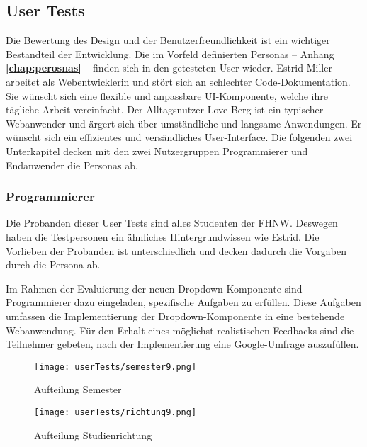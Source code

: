 \subsection{User Tests}
\label{sec:userTests}

Die Bewertung des Design und der Benutzerfreundlichkeit ist ein wichtiger Bestandteil der Entwicklung. 
Die im Vorfeld definierten Personas – Anhang \textbf{\ref{chap:perosnas}} – finden sich in den getesteten User wieder. 
Estrid Miller arbeitet als Webentwicklerin und stört sich an schlechter Code-Dokumentation. 
Sie wünscht sich eine flexible und anpassbare UI-Komponente, welche ihre tägliche Arbeit vereinfacht. 
Der Alltagsnutzer Love Berg ist ein typischer Webanwender und ärgert sich über umständliche und langsame Anwendungen. 
Er wünscht sich ein effizientes und versändliches User-Interface. 
Die folgenden zwei Unterkapitel decken mit den zwei Nutzergruppen Programmierer und Endanwender die Personas ab. 


\subsubsection{Programmierer}
\label{sec:userTestsProgrammer}

Die Probanden dieser User Tests sind alles Studenten der FHNW. 
Deswegen haben die Testpersonen ein ähnliches Hintergrundwissen wie Estrid. 
Die Vorlieben der Probanden ist unterschiedlich und decken dadurch die Vorgaben durch die Persona ab. 

Im Rahmen der Evaluierung der neuen Dropdown-Komponente sind Programmierer dazu eingeladen, spezifische Aufgaben zu erfüllen. 
Diese Aufgaben umfassen die Implementierung der Dropdown-Komponente in eine bestehende Webanwendung. 
Für den Erhalt eines möglichst realistischen Feedbacks sind die Teilnehmer gebeten, nach der Implementierung eine Google-Umfrage auszufüllen. 

\begin{figure}[!htb]
    \centering
    \begin{minipage}[b]{0.45\textwidth}
        \centering
        \texttt{[image: userTests/semester9.png]}
        \caption{\centering Aufteilung Semester}
        \label{img:userTestsSemester}
    \end{minipage}
    \hfill
    \begin{minipage}[b]{0.45\textwidth}
        \centering
        \texttt{[image: userTests/richtung9.png]}
        \caption{\centering Aufteilung Studienrichtung}
        \label{img:userTestsStudy}
    \end{minipage}
\end{figure}

